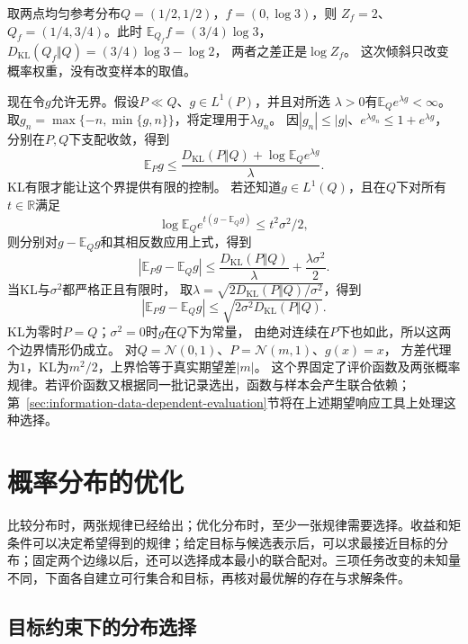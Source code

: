 取两点均匀参考分布\(Q=(1/2,1/2)\)，\(f=(0,\log3)\)，则
\(Z_f=2\)、\(Q_f=(1/4,3/4)\)。此时
\(\mathbb E_{Q_f}f=(3/4)\log3\)，
\(D_{\mathrm{KL}}(Q_f\Vert Q)=(3/4)\log3-\log2\)，
两者之差正是\(\log Z_f\)。
这次倾斜只改变概率权重，没有改变样本的取值。

现在令\(g\)允许无界。假设\(P\ll Q\)、\(g\in L^1(P)\)，并且对所选
\(\lambda>0\)有\(\mathbb E_Qe^{\lambda g}<\infty\)。
取\(g_n=\max\{-n,\min\{g,n\}\}\)，将定理用于\(\lambda g_n\)。
因\(|g_n|\leq|g|\)、\(e^{\lambda g_n}\leq1+e^{\lambda g}\)，
分别在\(P,Q\)下支配收敛，得到
\begin{equation}
  \mathbb E_Pg
  \leq\frac{D_{\mathrm{KL}}(P\Vert Q)+\log\mathbb E_Qe^{\lambda g}}{\lambda}.
  \label{eq:information-change-measure-expectation}
\end{equation}
KL有限才能让这个界提供有限的控制。
若还知道\(g\in L^1(Q)\)，且在\(Q\)下对所有\(t\in\mathbb R\)满足
\[
  \log\mathbb E_Qe^{t(g-\mathbb E_Qg)}\leq t^2\sigma^2/2,
\]
则分别对\(g-\mathbb E_Qg\)和其相反数应用上式，得到
\[
  |\mathbb E_Pg-\mathbb E_Qg|
  \leq\frac{D_{\mathrm{KL}}(P\Vert Q)}{\lambda}+\frac{\lambda\sigma^2}{2}.
\]
当KL与\(\sigma^2\)都严格正且有限时，
取\(\lambda=\sqrt{2D_{\mathrm{KL}}(P\Vert Q)/\sigma^2}\)，得到
\begin{equation}
  |\mathbb E_Pg-\mathbb E_Qg|
  \leq\sqrt{2\sigma^2D_{\mathrm{KL}}(P\Vert Q)}.
  \label{eq:information-subgaussian-change-measure}
\end{equation}
KL为零时\(P=Q\)；\(\sigma^2=0\)时\(g\)在\(Q\)下为常量，
由绝对连续在\(P\)下也如此，所以这两个边界情形仍成立。
对\(Q=\mathcal N(0,1)\)、\(P=\mathcal N(m,1)\)、\(g(x)=x\)，
方差代理为\(1\)，KL为\(m^2/2\)，上界恰等于真实期望差\(|m|\)。
这个界固定了评价函数及两张概率规律。若评价函数又根据同一批记录选出，函数与样本会产生联合依赖；第~\ref{sec:information-data-dependent-evaluation}节将在上述期望响应工具上处理这种选择。

\section{概率分布的优化}
\label{sec:information-variational-learning}

比较分布时，两张规律已经给出；优化分布时，至少一张规律需要选择。收益和矩条件可以决定希望得到的规律；给定目标与候选表示后，可以求最接近目标的分布；固定两个边缘以后，还可以选择成本最小的联合配对。三项任务改变的未知量不同，下面各自建立可行集合和目标，再核对最优解的存在与求解条件。

\subsection{目标约束下的分布选择}
\label{sec:information-target-distribution}

